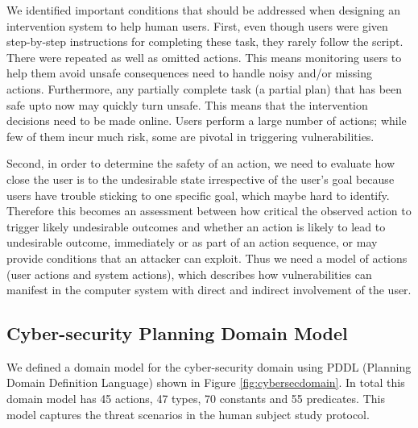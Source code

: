 \documentclass[doctor]{thesis} %
\theoremstyle{plain}
\begin{document}
We identified important conditions that should be addressed when designing an intervention system to help human users. First, even though users were given step-by-step instructions for completing these task, they rarely follow the script. There were repeated as well as omitted actions. This means monitoring users to help them avoid unsafe consequences need to handle noisy and/or missing actions. Furthermore, any partially complete task (a partial plan) that has been safe upto now may quickly turn unsafe. This means that the intervention decisions need to be made online. Users perform a large number of actions; while few of them incur much risk, some are pivotal in triggering vulnerabilities.

Second, in order to determine the safety of an action, we need to evaluate how close the user is to the undesirable state irrespective of the user's goal because users have trouble sticking to one specific goal, which maybe hard to identify. Therefore this becomes an assessment between how critical the observed action to trigger likely undesirable outcomes and whether an action is likely to lead to undesirable outcome, immediately or as part of an action sequence, or may provide conditions that an attacker can exploit.  Thus we need a model of actions (user actions and system actions), which describes how vulnerabilities can manifest in the computer system with direct and indirect involvement of the user.



\subsection*{Cyber-security Planning Domain Model}
We defined a domain model for the cyber-security domain using PDDL (Planning Domain Definition Language) shown in Figure \ref{fig:cybersecdomain}. In total this domain model has 45 actions, 47 types, 70 constants and 55 predicates. This model captures the threat scenarios in the human subject study protocol.
\end{document}
